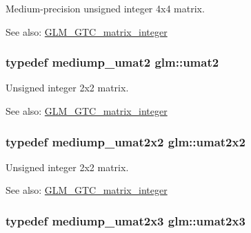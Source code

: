 Medium-precision unsigned integer 4x4 matrix. \begin{Desc}
\item[See also:]\hyperlink{group__gtc__matrix__integer}{GLM\_\-GTC\_\-matrix\_\-integer} \end{Desc}
\hypertarget{group__gtc__matrix__integer_ge2d45c058cfa0b60ab4df0cdda2d8516}{
\subsubsection[umat2]{\setlength{\rightskip}{0pt plus 5cm}typedef mediump\_\-umat2 {\bf glm::umat2}}}
\label{group__gtc__matrix__integer_ge2d45c058cfa0b60ab4df0cdda2d8516}


Unsigned integer 2x2 matrix. \begin{Desc}
\item[See also:]\hyperlink{group__gtc__matrix__integer}{GLM\_\-GTC\_\-matrix\_\-integer} \end{Desc}
\hypertarget{group__gtc__matrix__integer_gd3c997b31dd69bdb4787867e758ed48d}{
\subsubsection[umat2x2]{\setlength{\rightskip}{0pt plus 5cm}typedef mediump\_\-umat2x2 {\bf glm::umat2x2}}}
\label{group__gtc__matrix__integer_gd3c997b31dd69bdb4787867e758ed48d}


Unsigned integer 2x2 matrix. \begin{Desc}
\item[See also:]\hyperlink{group__gtc__matrix__integer}{GLM\_\-GTC\_\-matrix\_\-integer} \end{Desc}
\hypertarget{group__gtc__matrix__integer_g890ae28f9230794138b2c89f44ce3376}{
\subsubsection[umat2x3]{\setlength{\rightskip}{0pt plus 5cm}typedef mediump\_\-umat2x3 {\bf glm::umat2x3}}}
\label{group__gtc__matrix__integer_g890ae28f9230794138b2c89f44ce3376}


